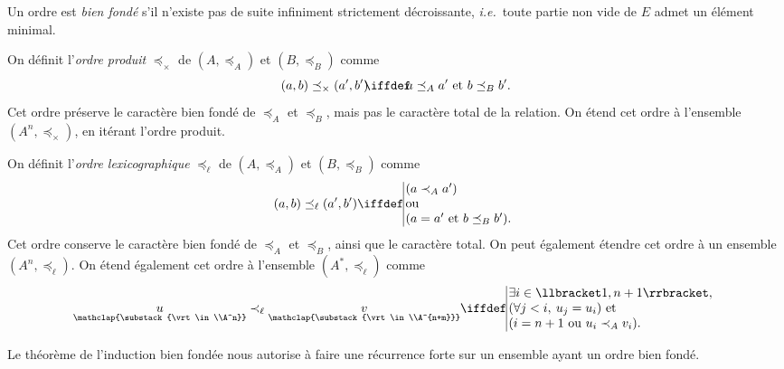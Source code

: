 \begin{multicols}{2}
	\vfill
	\vfill
	\begin{recap-box}[frametitle={Ordre bien fondé}]
		Un ordre est \textit{bien fondé} s'il n'existe pas de suite infiniment strictement décroissante, \textit{i.e.}\ toute partie non vide de $E$\/ admet un élément minimal.
	\end{recap-box}
	\vfill
	\begin{recap-box}[frametitle={Ordre produit}]
		On définit l'\textit{ordre produit} $\preceq_\times$\/ de $(A, \preceq_A)$\/ et $(B, \preceq_B)$\/ comme \[
			(a, b) \preceq_\times (a', b')\!\!\iffdef\!\!a \preceq_A a' \text{ et } b \preceq_B b'
		.\] 
		Cet ordre préserve le caractère bien fondé de $\preceq_A$\/ et $\preceq_B$, mais pas le caractère total de la relation.
		On étend cet ordre à l'ensemble $(A^n, \preceq_\times)$, en itérant l'ordre produit.
	\end{recap-box}
	\vfill
	\begin{recap-box}[frametitle={Ordre lexicographique}]
		On définit l'\textit{ordre lexicographique} $\preceq_\ell$\/ de $(A, \preceq_A)$\/ et $(B, \preceq_B)$\/ comme \[
			(a, b) \preceq_\ell (a', b') \iffdef
			\begin{array}{|l}
				\!\!(a \prec_A a')\\
				\!\!\text{ou }\\
				\!\!(a = a' \text{ et } b \preceq_B b').
			\end{array}
		\]
		Cet ordre conserve le caractère bien fondé de $\preceq_A$\/ et $\preceq_B$, ainsi que le caractère total. On peut également étendre cet ordre à un ensemble $(A^n, \preceq_\ell)$.
		On étend également cet ordre à l'ensemble $(A^*, \preceq_\ell)$\/ comme \[
			\underset{\mathclap{\substack{\vrt\in\\A^n}}} u
			\prec_\ell
			\underset{\mathclap{\substack{\vrt\in\\A^{n+m}}}} v
			\iffdef 
			\begin{array}{|l}
				\!\! \exists i \in \llbracket 1, n + 1 \rrbracket,\\
				\!\! (\forall j < i,\: u_j = u_i) \text{ et}\\
				\!\! (i = n + 1 \text{ ou } u_i \prec_A v_i).
			\end{array}
		\]
	\end{recap-box}
	\vfill
	\begin{recap-box}
		Le théorème de l'induction bien fondée nous autorise à faire une récurrence forte sur un ensemble ayant un ordre bien fondé.

\end{recap-box}
\end{multicols}
